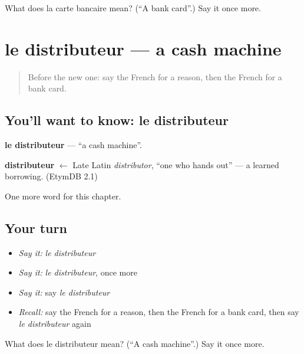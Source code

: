 \begin{tcolorbox}[breakable,colback=teal!4,colframe=teal!35!black,title={Before you move on}]
What does la carte bancaire mean? (\textquotedblleft{}A bank card\textquotedblright{}.) Say it once more.
\end{tcolorbox}
\section[le distributeur]{le distributeur — a cash machine}

\label{lesson:FR-C226-distributeur}



\begin{quote}
Before the new one: say the French for a reason, then the French for a bank card.
\end{quote}

\subsection*{You'll want to know: le distributeur}
\textbf{le distributeur} — \textquotedblleft{}a cash machine\textquotedblright{}.

\begin{cousinweb}
\textbf{distributeur} $\leftarrow$ Late Latin \emph{distributor}, \textquotedblleft{}one who hands out\textquotedblright{} — a learned borrowing. (EtymDB 2.1)
\end{cousinweb}

\begin{grammarlens}[title={What you've built}]
One more word for this chapter.
\end{grammarlens}

\subsection*{Your turn}
\begin{itemize}
\raggedright
  \item \emph{Say it:} \emph{le distributeur}
  \item \emph{Say it:} \emph{le distributeur}, once more
  \item \emph{Say it:} say \emph{le distributeur}
  \item \emph{Recall:} say the French for a reason, then the French for a bank card, then say \emph{le distributeur} again
\end{itemize}

\begin{tcolorbox}[breakable,colback=teal!4,colframe=teal!35!black,title={Before you move on}]
What does le distributeur mean? (\textquotedblleft{}A cash machine\textquotedblright{}.) Say it once more.
\end{tcolorbox}
